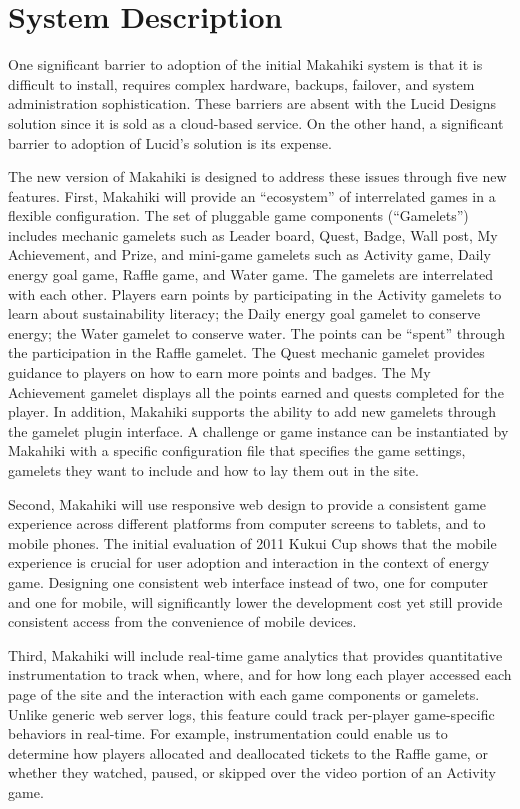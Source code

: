 \documentclass{acm_proc_article-sp}
\begin{document}
\section{System Description}

One significant barrier to adoption of the initial Makahiki system is that it is difficult to install, requires complex hardware, backups, failover, and system administration sophistication. These barriers are absent with the Lucid Designs solution since it is sold as a cloud-based service. On the other hand, a significant barrier to adoption of Lucid's solution is its expense.

The new version of Makahiki is designed to address these issues through five new features.  First, Makahiki will provide an ``ecosystem'' of interrelated games in a flexible configuration. The set of pluggable game components (``Gamelets'') includes mechanic gamelets such as Leader board, Quest, Badge, Wall post, My Achievement, and Prize, and mini-game gamelets such as Activity game, Daily energy goal game, Raffle game, and Water game. The gamelets are interrelated with each other. Players earn points by participating in the Activity gamelets to learn about sustainability literacy; the Daily energy goal gamelet to conserve energy; the Water gamelet to conserve water. The points can be ``spent'' through the participation in the Raffle gamelet. The Quest mechanic gamelet provides guidance to players on how to earn more points and badges. The My Achievement gamelet displays all the points earned and quests completed for the player. In addition, Makahiki supports the ability to add new gamelets through the gamelet plugin interface. A challenge or game instance can be instantiated by Makahiki with a specific configuration file that specifies the game settings, gamelets they want to include and how to lay them out in the site.

Second, Makahiki will use responsive web design \cite{marcotte2011responsive} to provide a consistent game experience across different platforms from computer screens to tablets, and to mobile phones. The  initial evaluation of 2011 Kukui Cup shows that the mobile experience is crucial for user adoption and interaction in the context of energy game. Designing one consistent web interface instead of two, one for computer and one for mobile, will significantly lower the development cost yet still provide consistent access from the convenience of mobile devices. 

Third, Makahiki will include real-time game analytics that provides quantitative instrumentation to track when, where, and for how long each player accessed each page of the site and the interaction with each game components or gamelets.  Unlike generic web server logs, this feature could track per-player game-specific behaviors in real-time. For example, instrumentation could enable us to determine how players allocated and deallocated tickets to the Raffle game, or whether they watched, paused, or skipped over the video portion of an Activity game.
\end{document}
